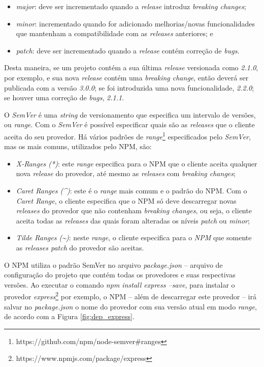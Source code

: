 \begin{itemize}
    \item \textit{major}: deve ser incrementado quando a \textit{release} introduz \textit{breaking changes};
    \item \textit{minor}: incrementado quando for adicionado melhorias/novas funcionalidades que mantenham a compatibilidade com as \textit{releases} anteriores; e
    \item \textit{patch}: deve ser incrementado quando a \textit{release} contém correção de \textit{bugs}.
\end{itemize}{}

Desta maneira, se um projeto contém a sua última \textit{release} versionada como \textit{2.1.0}, por exemplo, e sua nova \textit{release} contém uma \textit{breaking change},  então deverá ser publicada com a versão \textit{3.0.0}; se foi introduzida uma nova funcionalidade, \textit{2.2.0}; se houver uma correção de \textit{bugs}, \textit{2.1.1}.

O \textit{SemVer} é uma \textit{string} de versionamento que especifica um intervalo de versões, ou \textit{range}. Com o \textit{SemVer} é possível especificar quais são as \textit{releases} que o cliente aceita do seu provedor. Há vários padrões de \textit{range}\footnote{https://github.com/npm/node-semver\#ranges} especificados pelo \textit{SemVer}, mas os mais comuns, utilizados pelo \gls{NPM}, são:

\begin{itemize}
    \item \textit{X-Ranges (*)}: este \textit{range} especifica para o \gls{NPM} que o cliente aceita qualquer nova \textit{release} do provedor, até mesmo as \textit{releases} com \textit{breaking changes};
    \item \textit{Caret Ranges (\textasciicircum)}: este é o \textit{range} mais comum e o padrão do \gls{NPM}. Com o \textit{Caret Range}, o cliente especifica que o \gls{NPM} só deve descarregar novas \textit{releases} do provedor que não contenham \textit{breaking changes}, ou seja, o cliente aceita todas as \textit{releases} das quais foram alteradas os níveis \textit{patch} ou \textit{minor};
    \item \textit{Tilde Ranges (\textasciitilde)}: neste \textit{range}, o cliente especifica para o \textit{NPM} que somente as \textit{releases patch} do provedor são aceitas.
\end{itemize}{}

O \gls{NPM} utiliza o padrão \gls{SemVer} no arquivo \textit{package.json} -- arquivo de configuração do projeto que contém todas os provedores e suas respectivas versões. Ao executar o comando \textit{npm install express --save}, para instalar o provedor \textit{express}\footnote{https://www.npmjs.com/package/express} por exemplo, o \gls{NPM} -- além de descarregar este provedor -- irá salvar no \textit{package.json} o nome do provedor com sua versão atual em modo \textit{range}, de acordo com a Figura \ref{fig:dep_express}.

